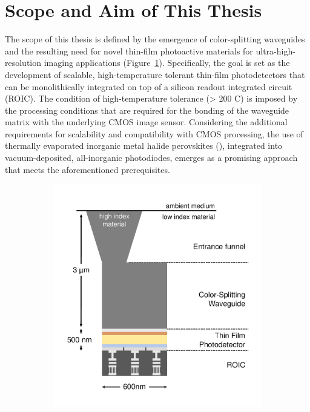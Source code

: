 \section{Scope and Aim of This Thesis}

The scope of this thesis is defined by the emergence of color-splitting waveguides and the resulting need for novel thin-film photoactive materials for ultra-high-resolution imaging applications (Figure~\ref{fig:ch1:scope}). Specifically, the goal is set as the development of scalable, high-temperature tolerant thin-film photodetectors that can be monolithically integrated on top of a silicon readout integrated circuit (ROIC). The condition of high-temperature tolerance (> 200 \degree C) is imposed by the processing conditions that are required for the bonding of the waveguide matrix with the underlying CMOS image sensor. Considering the additional requirements for scalability and compatibility with CMOS processing, the use of thermally evaporated inorganic metal halide perovskites (), integrated into vacuum-deposited, all-inorganic photodiodes, emerges as a promising approach that meets the aforementioned prerequisites.


\begin{figure}[htbp]
    \centering
    \begin{subfigure}[t]{0.7\textwidth} %
        \centering
        \includegraphics[width=\textwidth]{chapters/introduction/image/waveguide_pepd.pdf} %
    \end{subfigure}

    \caption{}
    \label{fig:ch1:scope}
\end{figure}


